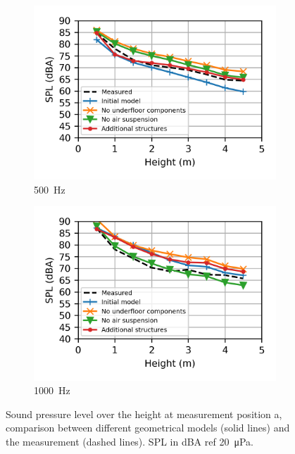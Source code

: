\begin{figure}
\begin{subfigure}[b]{0.49\textwidth}
		\includegraphics{fig/chap5/geometry_variation/third_octave_over_height/500_Hz.png}
		\caption{\SI{500}{\hertz}}
	\end{subfigure}
	\hfill
	\begin{subfigure}[b]{0.49\textwidth}
		\centering
		\includegraphics{fig/chap5/geometry_variation/third_octave_over_height/1000_Hz.png}
		\caption{\SI{1000}{\hertz}}
	\end{subfigure}
	\caption{Sound pressure level over the height at measurement position a, comparison between different geometrical models (solid lines) and the measurement (dashed lines). SPL in dBA ref \SI{20}{\micro\pascal}.}
	\label{fig:third_octave_over_height_geometry_variation}
\end{figure}

